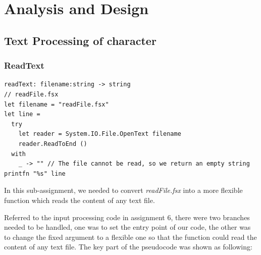 \documentclass{article}
\begin{document}




\section{Analysis and Design}

\subsection{Text Processing of character}
\subsubsection{ReadText}
\begin{lstlisting}
readText: filename:string -> string
// readFile.fsx
let filename = "readFile.fsx"
let line = 
  try
    let reader = System.IO.File.OpenText filename
    reader.ReadToEnd ()
  with
    _ -> "" // The file cannot be read, so we return an empty string
printfn "%s" line
\end{lstlisting}

In this sub-assignment, we needed to convert \emph{readFile.fsx} into a more flexible function which reads the content of any text file.

Referred to the input processing code in assignment 6, there were two branches needed to be handled, one was to set the entry point of our code, the other was to change the fixed argument to a flexible one so that the function could read the content of any text file. The key part of the pseudocode was shown as following:
\end{document}
